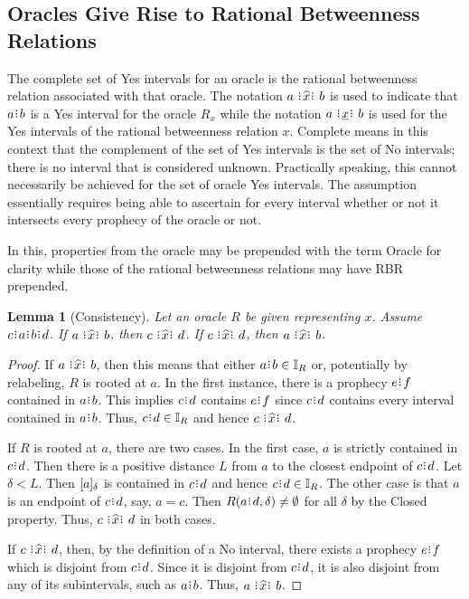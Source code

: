 \documentclass[12pt]{article}
\newtheorem{lemma}{Lemma}[section]
\begin{document}
\subsection{Oracles Give Rise to Rational Betweenness Relations}

The complete set of Yes intervals for an oracle is the rational betweenness relation associated with that oracle. The notation $a \xora b$ is used to indicate that $a\rint b$ is a Yes interval for the oracle $R_x$ while the notation $a \xrel b$ is used for the Yes intervals of the rational betweenness relation $x$. Complete means in this context that the complement of the set of Yes intervals is the set of No intervals; there is no interval that is considered unknown. Practically speaking, this cannot necessarily be achieved for the set of oracle Yes intervals. The assumption essentially requires being able to ascertain for every interval whether or not it intersects every prophecy of the oracle or not. 

In this, properties from the oracle may be prepended with the term Oracle for clarity while those of the rational betweenness relations may have RBR prepended. 

\begin{lemma}[Consistency]\label{os-con}
    Let an oracle $R$ be given representing $x$. Assume $c\rint a\rint b\rint d$. If $a \xora b$, then $c \xora d$. If \sout{$c \xora d$}, then \sout{$a \xora b$}. 
\end{lemma}

\begin{proof}
    If $a \xora b$, then this means that either $a\rint b \in \mathbb{I}_R$ or, potentially by relabeling, $R$ is rooted at $a$. In the first instance, there is a prophecy $e\rint f$ contained in $a\rint b$. This implies $c\rint d$ contains $e\rint f$ since $c\rint d$ contains every interval contained in $a\rint b$. Thus, $c\rint d \in \mathbb{I}_R$ and hence $c \xora d$. 
    
    If $R$ is rooted at $a$, there are two cases. In the first case, $a$ is strictly contained in $c\rint d$. Then there is a positive distance $L$ from $a$ to the closest endpoint of $c\rint d$. Let $\delta < L$. Then $[a]_{\delta}$ is contained in $c\rint d$ and hence $c\rint d \in \mathbb{I}_R$. The other case is that $a$ is an endpoint of $c\rint d$, say, $ a= c$. Then $R(a\rint d, \delta) \neq \emptyset$ for all $\delta$ by the Closed property. Thus, $c \xora d$ in both cases.  

    If \sout{$c \xora d$}, then, by the definition of a No interval, there exists a prophecy $e\rint f$ which is disjoint from $c\rint d$. Since it is disjoint from $c\rint d$, it is also disjoint from any of its subintervals, such as $a\rint b$. Thus, \sout{$a \xora b$}.    
\end{proof}
\end{document}
